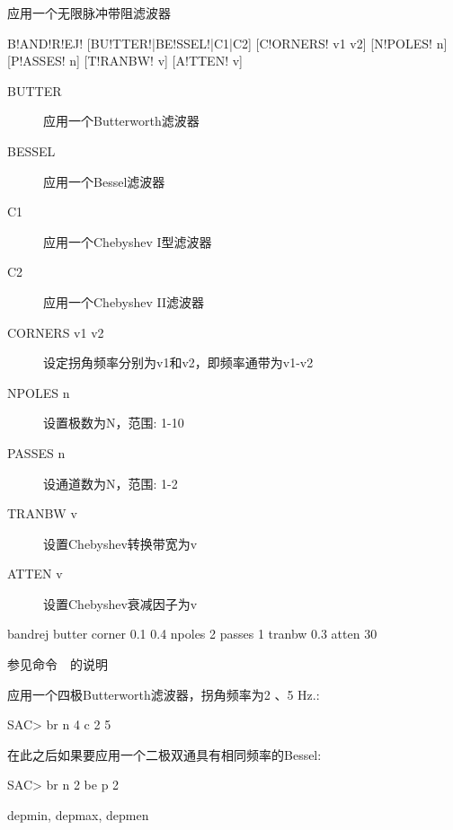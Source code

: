 \label{cmd:bandrej}

应用一个无限脉冲带阻滤波器

\begin{SACSTX}
B!AND!R!EJ! [BU!TTER!|BE!SSEL!|C1|C2] [C!ORNERS! v1 v2] [N!POLES! n] [P!ASSES! n]
    [T!RANBW! v] [A!TTEN! v]
\end{SACSTX}

\begin{description}
\item [BUTTER] 应用一个Butterworth滤波器
\item [BESSEL] 应用一个Bessel滤波器
\item [C1] 应用一个Chebyshev I型滤波器
\item [C2] 应用一个Chebyshev II滤波器
\item [CORNERS v1 v2] 设定拐角频率分别为v1和v2，即频率通带为v1-v2
\item [NPOLES n] 设置极数为N，范围: 1-10
\item [PASSES n] 设通道数为N，范围: 1-2
\item [TRANBW v] 设置Chebyshev转换带宽为v
\item [ATTEN v] 设置Chebyshev衰减因子为v
\end{description}

\begin{SACDFT}
bandrej butter corner 0.1 0.4 npoles 2 passes 1 tranbw 0.3 atten 30
\end{SACDFT}

参见命令~~的说明

应用一个四极Butterworth滤波器，拐角频率为2 、5 Hz.:
\begin{SACCode}
SAC> br n 4 c 2 5
\end{SACCode}

在此之后如果要应用一个二极双通具有相同频率的Bessel:
\begin{SACCode}
SAC> br n 2 be p 2
\end{SACCode}

depmin, depmax, depmen

